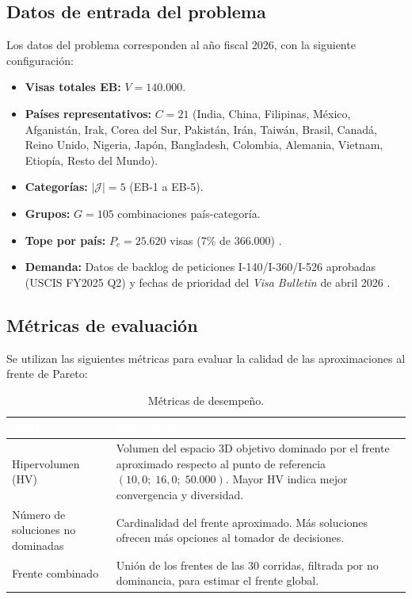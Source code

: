 \documentclass[12pt,letterpaper]{article}
\begin{document}
\subsection{Datos de entrada del problema}

Los datos del problema corresponden al año fiscal 2026, con la siguiente configuración:

\begin{itemize}
    \item \textbf{Visas totales EB:} $V = 140.000$.
    \item \textbf{Países representativos:} $C = 21$ (India, China, Filipinas, México, Afganistán, Irak, Corea del Sur, Pakistán, Irán, Taiwán, Brasil, Canadá, Reino Unido, Nigeria, Japón, Bangladesh, Colombia, Alemania, Vietnam, Etiopía, Resto del Mundo).
    \item \textbf{Categorías:} $|\mathcal{J}| = 5$ (EB-1 a EB-5).
    \item \textbf{Grupos:} $G = 105$ combinaciones país-categoría.
    \item \textbf{Tope por país:} $P_c = 25.620$ visas (7\% de 366.000) \parencite{crs2023}.
    \item \textbf{Demanda:} Datos de backlog de peticiones I-140/I-360/I-526 aprobadas (USCIS FY2025 Q2) y fechas de prioridad del \textit{Visa Bulletin} de abril 2026 \parencite{dosfeb2026, uscis2023}.
\end{itemize}

\subsection{Métricas de evaluación}

Se utilizan las siguientes métricas para evaluar la calidad de las aproximaciones al frente de Pareto:

\begin{table}[H]
\centering
\caption{Métricas de desempeño.}
\label{tab:metricas}
\renewcommand{\arraystretch}{1.4}
\begin{tabular}{lp{9cm}}
\toprule
\rowcolor{tablehead}
\textcolor{white}{\textbf{Métrica}} & \textcolor{white}{\textbf{Descripción}} \\
\midrule
Hipervolumen (HV) & Volumen del espacio 3D objetivo dominado por el frente aproximado respecto al punto de referencia $(10{,}0;\; 16{,}0;\; 50.000)$. Mayor HV indica mejor convergencia y diversidad. \\
\rowcolor{gray!8}
Número de soluciones no dominadas & Cardinalidad del frente aproximado. Más soluciones ofrecen más opciones al tomador de decisiones. \\
Frente combinado & Unión de los frentes de las 30 corridas, filtrada por no dominancia, para estimar el frente global. \\
\bottomrule
\end{tabular}
\end{table}
\end{document}
